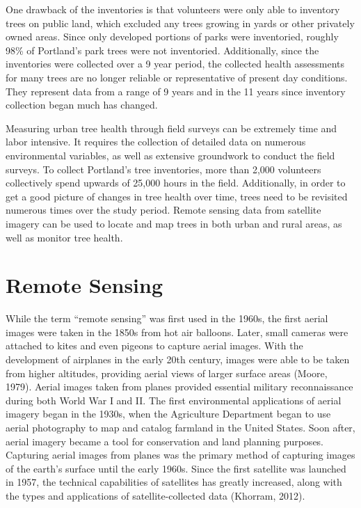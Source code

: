 \documentclass[12pt,twoside]{reedthesis}
\begin{document}
One drawback of the inventories is that volunteers were only able to inventory trees on public land, which excluded any trees growing in yards or other privately owned areas. Since only developed portions of parks were inventoried, roughly 98\% of Portland's park trees were not inventoried. Additionally, since the inventories were collected over a 9 year period, the collected health assessments for many trees are no longer reliable or representative of present day conditions. They represent data from a range of 9 years and in the 11 years since inventory collection began much has changed.

Measuring urban tree health through field surveys can be extremely time and labor intensive. It requires the collection of detailed data on numerous environmental variables, as well as extensive groundwork to conduct the field surveys. To collect Portland's tree inventories, more than 2,000 volunteers collectively spend upwards of 25,000 hours in the field. Additionally, in order to get a good picture of changes in tree health over time, trees need to be revisited numerous times over the study period. Remote sensing data from satellite imagery can be used to locate and map trees in both urban and rural areas, as well as monitor tree health.

\hypertarget{remote-sensing}{%
\section{Remote Sensing}\label{remote-sensing}}

While the term ``remote sensing'' was first used in the 1960s, the first aerial images were taken in the 1850s from hot air balloons. Later, small cameras were attached to kites and even pigeons to capture aerial images. With the development of airplanes in the early 20th century, images were able to be taken from higher altitudes, providing aerial views of larger surface areas (Moore, 1979). Aerial images taken from planes provided essential military reconnaissance during both World War I and II. The first environmental applications of aerial imagery began in the 1930s, when the Agriculture Department began to use aerial photography to map and catalog farmland in the United States. Soon after, aerial imagery became a tool for conservation and land planning purposes. Capturing aerial images from planes was the primary method of capturing images of the earth's surface until the early 1960s. Since the first satellite was launched in 1957, the technical capabilities of satellites has greatly increased, along with the types and applications of satellite-collected data (Khorram, 2012).
\end{document}
